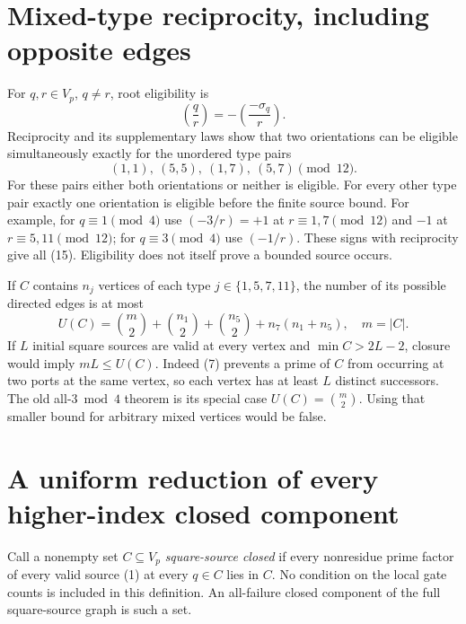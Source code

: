 \section{Mixed-type reciprocity, including opposite edges}
For $q,r\in V_p$, $q\ne r$, root eligibility is
\[
 \left(\frac qr\right)=-\left(\frac{-\sigma_q}{r}\right).
                                                               \tag{14}
\]
Reciprocity and its supplementary laws show that two orientations can be eligible
simultaneously exactly for the unordered type pairs
\[
 \boxed{(1,1),\ (5,5),\ (1,7),\ (5,7)\pmod{12}.}        \tag{15}
\]
For these pairs either both orientations or neither is eligible. For every other
type pair exactly one orientation is eligible before the finite source bound.
For example, for $q\equiv1\pmod4$ use
$(-3/r)=+1$ at $r\equiv1,7\pmod{12}$ and $-1$ at $r\equiv5,11\pmod{12}$;
for $q\equiv3\pmod4$ use $(-1/r)$. These signs with reciprocity give all (15).
Eligibility does not itself prove a bounded source occurs.

If $C$ contains $n_j$ vertices of each type $j\in\{1,5,7,11\}$, the number of
its possible directed edges is at most
\[
 U(C)=\binom m2+\binom{n_1}2+\binom{n_5}2+n_7(n_1+n_5),\quad m=|C|.
                                                               \tag{16}
\]
If $L$ initial square sources are valid at every vertex and $\min C>2L-2$,
closure would imply $mL\le U(C)$. Indeed (7) prevents a prime of $C$ from occurring
at two ports at the same vertex, so each vertex has at least $L$ distinct
successors. The old all-$3\bmod4$ theorem is its special case $U(C)=\binom m2$.
Using that smaller bound for arbitrary mixed vertices would be false.

\section{A uniform reduction of every higher-index closed component}
Call a nonempty set $C\subseteq V_p$ \emph{square-source closed} if every
nonresidue prime factor of every valid source (1) at every $q\in C$ lies in $C$.
No condition on the local gate counts is included in this definition. An all-failure
closed component of the full square-source graph is such a set.

